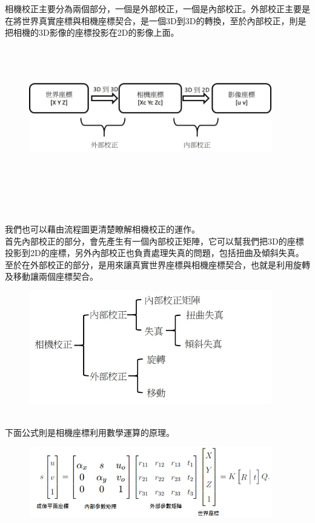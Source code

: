 \documentclass{article}
\begin{document}
相機校正主要分為兩個部分，一個是外部校正，一個是內部校正。外部校正主要是在將世界真實座標與相機座標契合，是一個3D到3D的轉換，至於內部校正，則是把相機的3D影像的座標投影在2D的影像上面。
\\\\\\\\
\begin{figure}[htp]
    \begin{center}
        \includegraphics[width=300pt]{pic/圖片3.jpg}
    \end{center}
\end{figure}
\\\\\\\\\\我們也可以藉由流程圖更清楚瞭解相機校正的運作。
\\首先內部校正的部分，會先產生有一個內部校正矩陣，它可以幫我們把3D的座標投影到2D的座標，另外內部校正也負責處理失真的問題，包括扭曲及傾斜失真。
\\至於在外部校正的部分，是用來讓真實世界座標與相機座標契合，也就是利用旋轉及移動讓兩個座標契合。
\\
\begin{figure}[htp]
    \begin{center}
        \includegraphics[width=300pt]{pic/圖片4.jpg}
    \end{center}
\end{figure}
\\
下面公式則是相機座標利用數學運算的原理。
\\
\begin{figure}[htp]
    \begin{center}
        \includegraphics[width=300pt]{pic/圖片5.jpg}
    \end{center}
\end{figure}
\end{document}
